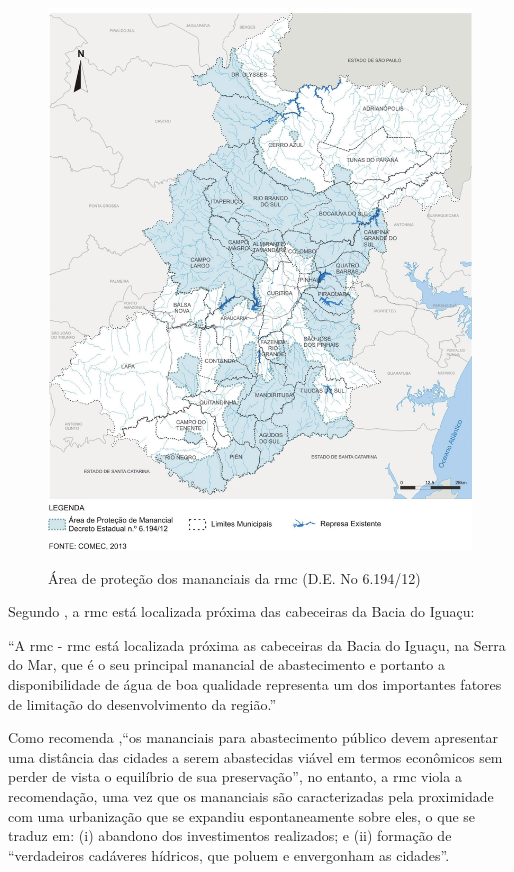	\begin{figure}
		\centering
		\caption{Área de proteção dos mananciais da \gls{rmc} (D.E. No 6.194/12)}
		\includegraphics[width=1.0\linewidth]{img/kornin2014a_01}
		\label{fig:kornin2014a_01}
	\end{figure}

	Segundo , a \gls{rmc} está localizada próxima das cabeceiras da Bacia do Iguaçu:
	
	\begin{citacao}
		``A \glsdesc{rmc} - \gls{rmc} está localizada próxima as cabeceiras da Bacia do Iguaçu, na Serra do Mar, que é o seu principal manancial de abastecimento e portanto a disponibilidade de água de boa qualidade representa um dos importantes fatores de limitação do desenvolvimento da região.''
	\end{citacao}

	Como recomenda ,``os mananciais para abastecimento público devem apresentar uma distância das cidades a serem abastecidas viável em termos econômicos sem perder de vista o equilíbrio de sua preservação'', no entanto, a \gls{rmc} viola a recomendação, uma vez que os mananciais são caracterizadas pela proximidade com uma urbanização que se expandiu espontaneamente sobre eles, o que se traduz em: (i) abandono dos investimentos realizados; e (ii) formação de ``verdadeiros cadáveres hídricos, que poluem e envergonham as cidades''.

